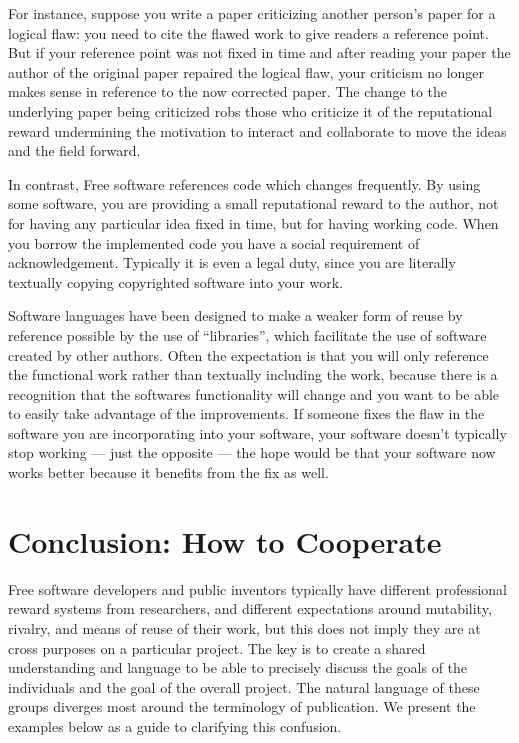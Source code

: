 \documentclass[
	fontsize=10pt, %
	twoside=false, %
	secnumdepth=1, %
]{kaobook}
\begin{document}
For instance, suppose you write a paper criticizing another person’s
paper for a logical flaw: you need to cite the flawed work to give
readers a reference point. But if your reference point was not fixed
in time and after reading your paper the author of the original paper
repaired the logical flaw, your criticism no longer makes sense in
reference to the now corrected paper. The change to the underlying
paper being criticized robs those who criticize it of the reputational
reward undermining the motivation to interact and collaborate to move
the ideas and the field forward.

In contrast, Free software references code which changes
frequently. By using some software, you are providing a small
reputational reward to the author, not for having any particular idea
fixed in time, but for having working code. When you borrow the
implemented code you have a social requirement of
acknowledgement. Typically it is even a legal duty, since you are
literally textually copying copyrighted software into your work.

Software languages have been designed to make a weaker form of reuse
by reference possible by the use of “libraries”, which facilitate the
use of software created by other authors. Often the expectation is
that you will only reference the functional work rather than textually
including the work, because there is a recognition that the softwares
functionality will change and you want to be able to easily take
advantage of the improvements. If someone fixes the flaw in the
software you are incorporating into your software, your software
doesn’t typically stop working — just the opposite — the hope would be
that your software now works better because it benefits from the fix
as well.

\section{Conclusion: How to Cooperate}
Free software developers and public inventors typically have different
professional reward systems from researchers, and different expectations around mutability,
rivalry, and means of reuse of their work, but this does not imply
they are at cross purposes on a particular project. The key is to
create a shared understanding and language to be able to precisely
discuss the goals of the individuals and the goal of the overall
project. The natural language of these groups diverges most around the
terminology of publication. We present the examples below as a guide
to clarifying this confusion.
\end{document}
